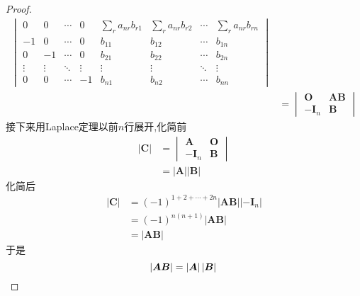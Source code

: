 {\begin{proof}
\begin{align*}
\begin{vmatrix}
                0      & 0      & \cdots & 0      & \displaystyle\sum_{r}a_{nr}b_{r1} & \displaystyle\sum_{r}a_{nr}b_{r2} & \cdots & \displaystyle\sum_{r}a_{nr}b_{rn} \\
                -1     & 0      & \cdots & 0      & b_{11}                            & b_{12}                            & \cdots & b_{1n}                            \\
                0      & -1     & \cdots & 0      & b_{21}                            & b_{22}                            & \cdots & b_{2n}                            \\
                \vdots & \vdots & \ddots & \vdots & \vdots                            & \vdots                            & \ddots & \vdots                            \\
                0      & 0      & \cdots & -1     & b_{n1}                            & b_{n2}                            & \cdots & b_{nn}
            \end{vmatrix} \\
                                & =
            \begin{vmatrix}
                \bm{O}    & \bm{AB} \\
                -\bm{I}_n & \bm{B}
            \end{vmatrix}
        \end{align*}
        接下来用Laplace定理以前$n$行展开,化简前
        \begin{align*}
            \left|\bm{C}\right| & =
            \begin{vmatrix}
                \bm{A}    & \bm{O} \\
                -\bm{I}_n & \bm{B}
            \end{vmatrix}                           \\
                                & =\left| \bm{A} \right|
            \left| \bm{B} \right|
        \end{align*}
        化简后
        \begin{align*}
            \left|
            \bm{C}
            \right|
             & =
            \left( -1 \right) ^{1+2+\cdots+2n}
            \left|\bm{AB}\right|
            \left|-\bm{I}_n\right|                                      \\
             & =\left(-1\right)^{n\left(n+1\right)}\left|\bm{AB}\right| \\
             & =\left|\bm{AB}\right|
        \end{align*}
        于是\[
            \left|\bm{AB}\right|=\left|\bm{A}\right|\left|\bm{B}\right|\qedhere
        \]
    \end{proof}
}